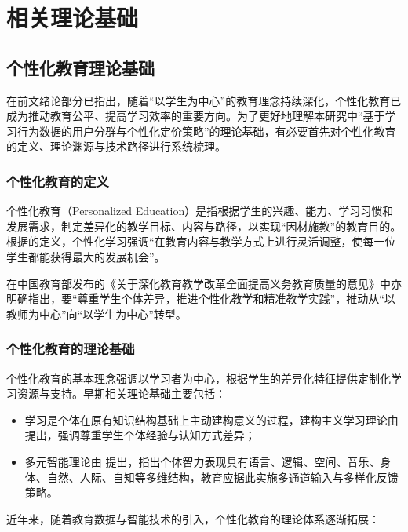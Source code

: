 
\chapter{相关理论基础}
\label{chapter:相关理论基础}

\section{个性化教育理论基础}
\label{sec:个性化教育理论基础}

在前文绪论部分已指出，随着“以学生为中心”的教育理念持续深化，个性化教育已成为推动教育公平、提高学习效率的重要方向。为了更好地理解本研究中“基于学习行为数据的用户分群与个性化定价策略”的理论基础，有必要首先对个性化教育的定义、理论渊源与技术路径进行系统梳理。

\subsection{个性化教育的定义}
个性化教育（Personalized Education）是指根据学生的兴趣、能力、学习习惯和发展需求，制定差异化的教学目标、内容与路径，以实现“因材施教”的教育目的。根据\cite{oecd2018teachers}的定义，个性化学习强调“在教育内容与教学方式上进行灵活调整，使每一位学生都能获得最大的发展机会”。

在中国教育部发布的《关于深化教育教学改革全面提高义务教育质量的意见》中亦明确指出，要“尊重学生个体差异，推进个性化教学和精准教学实践”，推动从“以教师为中心”向“以学生为中心”转型。

\subsection{个性化教育的理论基础}

个性化教育的基本理念强调以学习者为中心，根据学生的差异化特征提供定制化学习资源与支持。早期相关理论基础主要包括：

\begin{itemize}
\item 学习是个体在原有知识结构基础上主动建构意义的过程，建构主义学习理论由 \cite{piaget1971constructivism} 提出，强调尊重学生个体经验与认知方式差异；
\item 多元智能理论由 \cite{gardner1983frames}提出，指出个体智力表现具有语言、逻辑、空间、音乐、身体、自然、人际、自知等多维结构，教育应据此实施多通道输入与多样化反馈策略。
\end{itemize}

近年来，随着教育数据与智能技术的引入，个性化教育的理论体系逐渐拓展：

